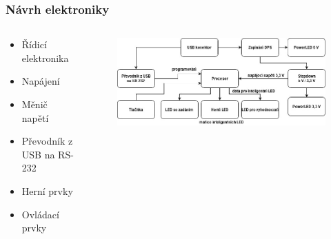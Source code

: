 \documentclass[%
  12pt,       				%
	t,                  %
	aspectratio=1610,   %
	unicode,						%
]{beamer}				    	%
\begin{document}


\begin{frame} 
	\frametitle{Návrh elektroniky}
	
	\begin{columns}[T] 								%
		\begin{column}{0.45\textwidth}		%
			\vspace{0.5cm}
			\begin{itemize}
				\item Řídicí elektronika
				\item Napájení
				\item Měnič napětí
				\item Převodník z USB na RS-232
				\item Herní prvky
				\item Ovládací prvky
			\end{itemize}
		\end{column}
		\begin{column}{0.55\textwidth}		%
			\begin{figure}%
				\centering
				\vspace{0.5cm}	              %
				\includegraphics[width=1\columnwidth]{obrazky/v1_blokove_schema.jpg}
			\end{figure}
		\end{column}
	\end{columns}											%
\end{frame}
\end{document}
